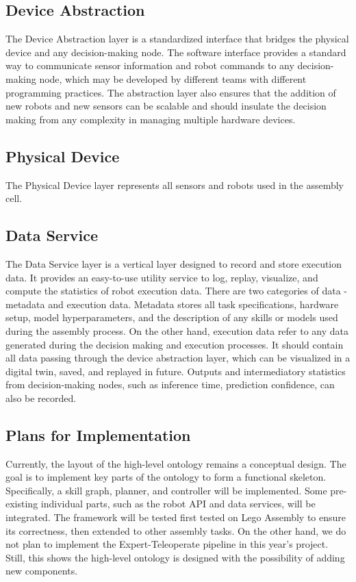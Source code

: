 \documentclass{article}
\begin{document}
\subsection{Device Abstraction}
The Device Abstraction layer is a standardized interface that bridges the physical device and any decision-making node. The software interface provides a standard way to communicate sensor information and robot commands to any decision-making node, which may be developed by different teams with different programming practices. The abstraction layer also ensures that the addition of new robots and new sensors can be scalable and should insulate the decision making from any complexity in managing multiple hardware devices.

\subsection{Physical Device}
The Physical Device layer represents all sensors and robots used in the assembly cell.

\subsection{Data Service}
The Data Service layer is a vertical layer designed to record and store execution data. It provides an easy-to-use utility service to log, replay, visualize, and compute the statistics of robot execution data. There are two categories of data - metadata and execution data. Metadata stores all task specifications, hardware setup, model hyperparameters, and the description of any skills or models used during the assembly process. On the other hand, execution data refer to any data generated during the decision making and execution processes. It should contain all data passing through the device abstraction layer, which can be visualized in a digital twin, saved, and replayed in future. Outputs and intermediatory statistics from decision-making nodes, such as inference time, prediction confidence, can also be recorded. 

\subsection{Plans for Implementation}
Currently, the layout of the high-level ontology remains a conceptual design. The goal is to implement key parts of the ontology to form a functional skeleton. Specifically, a skill graph, planner, and controller will be implemented. Some pre-existing individual parts, such as the robot API and data services, will be integrated. The framework will be tested first tested on Lego Assembly to ensure its correctness, then extended to other assembly tasks. On the other hand, we do not plan to implement the Expert-Teleoperate pipeline in this year's project. Still, this shows the high-level ontology is designed with the possibility of adding new components. 
\end{document}
